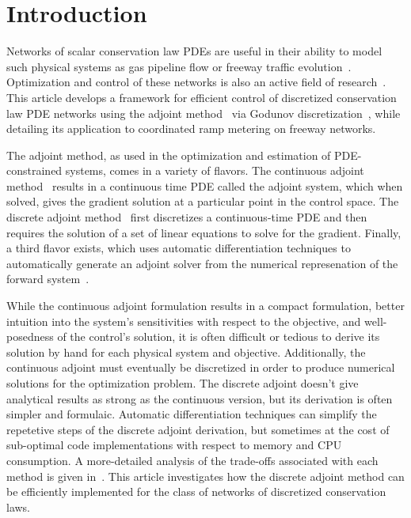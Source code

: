 \section{Introduction} %
\label{sec:introduction}

Networks of scalar conservation law PDEs are useful in their ability to model such physical systems as gas pipeline flow or freeway traffic evolution~\cite{garavello2006traffic,work2010traffic}. Optimization and control of these networks is also an active field of research~\cite{Gugat2005,Bayen2006,Kotsialos2004}. This article develops a framework for efficient control of discretized conservation law PDE networks using the adjoint method~\cite{Giles2000,Pironneau1974} via Godunov discretization~\cite{godunov1959}, while detailing its application to coordinated ramp metering on freeway networks.

The adjoint method, as used in the optimization and estimation of PDE-constrained systems, comes in a variety of flavors. The continuous adjoint method~\cite{Jacquet2005,Gugat2005,Moin1994,Reuther1996} results in a continuous time PDE called the adjoint system, which when solved, gives the gradient solution at a particular point in the control space. The discrete adjoint method~\cite{Giles2000,Gugat2005,Kotsialos2004} first discretizes a continuous-time PDE and then requires the solution of a set of linear equations to solve for the gradient. Finally, a third flavor exists, which uses automatic differentiation techniques to automatically generate an adjoint solver from the numerical represenation of the forward system~\cite{Giering1998,Muller2005}.

While the continuous adjoint formulation results in a compact formulation, better intuition into the system's sensitivities with respect to the objective, and well-posedness of the control's solution, it is often difficult or tedious to derive its solution by hand for each physical system and objective. Additionally, the continuous adjoint must eventually be discretized in order to produce numerical solutions for the optimization problem. The discrete adjoint doesn't give analytical results as strong as the continuous version, but its derivation is often simpler and formulaic. Automatic differentiation techniques can simplify the repetetive steps of the discrete adjoint derivation, but sometimes at the cost of sub-optimal code implementations with respect to memory and CPU consumption. A more-detailed analysis of the trade-offs associated with each method is given in~\cite{Giles}. This article investigates how the discrete adjoint method can be efficiently implemented for the class of networks of discretized conservation laws.


